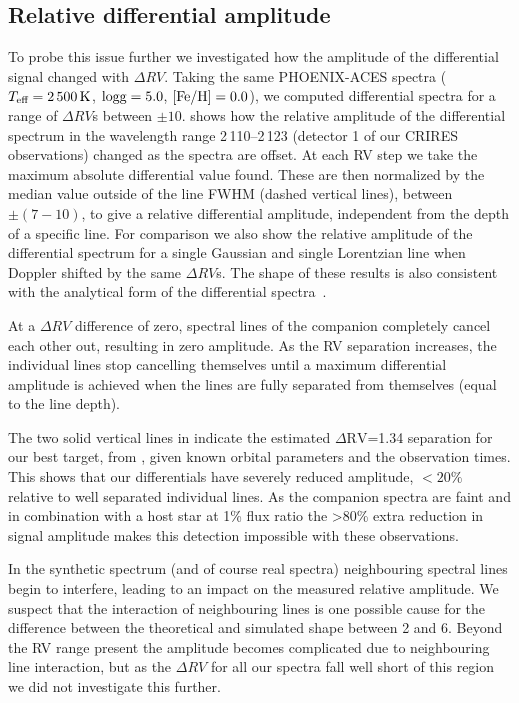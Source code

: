 \subsection{Relative differential amplitude}
To probe this issue further we investigated how the amplitude of the differential signal changed with \(\Delta {RV}\). Taking the same {PHOENIX-ACES} spectra (\(T_{\textrm{eff}} = 2\,500\,\si{\kelvin}{}\), \(\rm logg=5.0\), \(\rm \feh{}=0.0\)), we computed differential spectra for a range of \(\Delta {RV}\)s between \(\pm10\)\kmps{}.  shows how the relative amplitude of the differential spectrum in the wavelength range 2\,110--2\,123\nm{} (detector 1 of our {CRIRES} observations) changed as the spectra are offset. At each {RV} step we take the maximum absolute differential value found. These are then normalized by the median value outside of the line {FWHM} (dashed vertical lines), between \(\pm(7-10)\)\kmps{}, to give a relative differential amplitude, independent from the depth of a specific line. For comparison we also show the relative amplitude of the differential spectrum for a single Gaussian and single Lorentzian line when Doppler shifted by the same \(\Delta {RV}\)s. The shape of these results is also consistent with the analytical form of the differential spectra~\citet[][eqn.~A.1]{ferluga_separating_1997}.

At a \(\Delta {RV}\) difference of zero, spectral lines of the companion completely cancel each other out, resulting in zero amplitude. As the {RV} separation increases, the individual lines stop cancelling themselves until a maximum differential amplitude is achieved when the lines are fully separated from themselves (equal to the line depth).

The two solid vertical lines in  indicate the estimated \(\Delta \textrm{RV}\)=1.34\kmps{} separation for our best target,  from , given known orbital parameters and the observation times. This shows that our differentials have severely reduced amplitude, \(<20\%\) relative to well separated individual lines. As the companion spectra are faint and in combination with a host star at 1\% flux ratio the >80\% extra reduction in signal amplitude makes this detection impossible with these observations.

In the synthetic spectrum (and of course real spectra) neighbouring spectral lines begin to interfere, leading to an impact on the measured relative amplitude. We suspect that the interaction of neighbouring lines is one possible cause for the difference between the theoretical and simulated shape between 2 and 6\kmps{}. Beyond the {RV} range present the amplitude becomes complicated due to neighbouring line interaction, but as the \(\Delta {RV}\) for all our spectra fall well short of this region we did not investigate this further.

